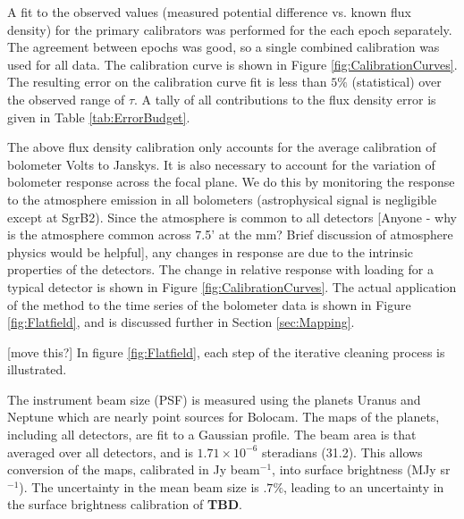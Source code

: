 \documentclass[12pt,preprint]{aastex}
\newcommand{\Check}{{\bf ???}}
\newcommand{\bcamfwhm}{31.2\arcsec}
\newcommand{\TBD}{{\bf TBD}}
\begin{document}
%

A fit to the observed values (measured potential difference vs. known flux
density) for the primary calibrators was performed for the each epoch
separately.
The agreement between epochs was good, so a single combined
calibration was used for all data.
The calibration curve is shown in Figure \ref{fig:CalibrationCurves}.  The
resulting error on the calibration curve fit is less than 
$5\%$ (statistical) over the observed range of $\tau$.  A tally of all
contributions to the flux density error is given in Table
\ref{tab:ErrorBudget}.

The above flux density calibration only accounts for the average
calibration of bolometer Volts to Janskys.  It is also necessary to
account for the variation of bolometer response across the focal
plane.  We do this by monitoring the response to the atmosphere
emission in all bolometers (astrophysical signal is negligible except at SgrB2).  Since the
atmosphere is common to all detectors [Anyone - why is the atmosphere common across 7.5'
at the mm?  Brief discussion of atmosphere physics would be helpful], any changes in response are due to the
intrinsic properties of the detectors.  The change in relative response with
loading for a typical detector is shown in Figure \ref{fig:CalibrationCurves}.
The actual application of the method to the time series of the bolometer
data is shown in Figure \ref{fig:Flatfield}, and is discussed further in
Section \ref{sec:Mapping}.

[move this?] In figure \ref{fig:Flatfield}, each step of the iterative cleaning process is illustrated.

The instrument beam size (PSF) is measured using the planets Uranus
and Neptune which are nearly point sources for Bolocam.
The maps of the planets, including all detectors, are fit to a
Gaussian profile.  The beam area is that averaged over all detectors,
and is $1.71\times10^{-6}$ steradians (\bcamfwhm).  This
allows conversion of the maps, calibrated in Jy beam$^{-1}$, into
surface brightness (MJy sr$^{-1}$).  The uncertainty in the mean beam size
is $.7\%$, leading to an uncertainty in the surface brightness calibration
of \TBD.
\end{document}
